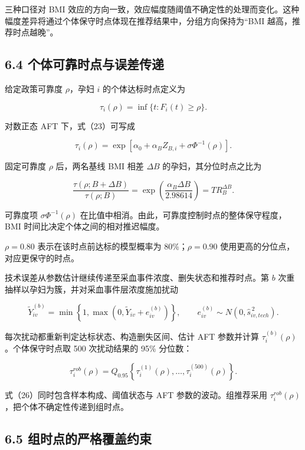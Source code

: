 \documentclass[UTF8,fontset=fandol,zihao=-4,a4paper]{ctexart}
\begin{document}
三种口径对 BMI
效应的方向一致，效应幅度随阈值不确定性的处理而变化。这种幅度差异将通过个体保守时点体现在推荐结果中，分组方向保持为``BMI
越高，推荐时点越晚''。

\subsection{6.4
个体可靠时点与误差传递}\label{ux4e2aux4f53ux53efux9760ux65f6ux70b9ux4e0eux8befux5deeux4f20ux9012}

给定政策可靠度 \(\rho\)，孕妇 \(i\) 的个体达标时点定义为

\[
\tau_i(\rho)
=\inf\{t:F_i(t)\ge\rho\}.
\tag{23}
\]

对数正态 AFT 下，式（23）可写成

\[
\tau_i(\rho)
=\exp\left[
\alpha_0+\alpha_BZ_{B,i}
+\sigma\Phi^{-1}(\rho)
\right].
\tag{24}
\]

固定可靠度 \(\rho\) 后，两名基线 BMI 相差 \(\Delta B\)
的孕妇，其分位时点之比为

\[
\frac{\tau(\rho;B+\Delta B)}{\tau(\rho;B)}
=\exp\left(\frac{\alpha_B\Delta B}{2.98614}\right)
=TR_B^{\Delta B}.
\tag{24a}
\]

可靠度项 \(\sigma\Phi^{-1}(\rho)\)
在比值中相消。由此，可靠度控制时点的整体保守程度，BMI
时间比决定个体之间的相对推迟幅度。

\(\rho=0.80\) 表示在该时点前达标的模型概率为 80\%；\(\rho=0.90\)
使用更高的分位点，对应更保守的时点。

技术误差从参数估计继续传递至采血事件浓度、删失状态和推荐时点。第 \(b\)
次重抽样以孕妇为簇，并对采血事件层浓度施加扰动

\[
\widetilde Y_{iv}^{(b)}
=\min\left\{
1,\max\left(0,\widetilde Y_{iv}+e_{iv}^{(b)}\right)
\right\},
\qquad
e_{iv}^{(b)}\sim N(0,\widehat s_{iv,tech}^{\,2}).
\tag{25}
\]

每次扰动都重新判定达标状态、构造删失区间、估计 AFT 参数并计算
\(\tau_i^{(b)}(\rho)\)。个体保守时点取 500 次扰动结果的 95\% 分位数：

\[
\tau_i^{rob}(\rho)
=Q_{0.95}\left\{
\tau_i^{(1)}(\rho),\ldots,
\tau_i^{(500)}(\rho)
\right\}.
\tag{26}
\]

式（26）同时包含样本构成、阈值状态与 AFT 参数的波动。组推荐采用
\(\tau_i^{rob}(\rho)\)，把个体不确定性传递到组时点。

\subsection{6.5
组时点的严格覆盖约束}\label{ux7ec4ux65f6ux70b9ux7684ux4e25ux683cux8986ux76d6ux7ea6ux675f}
\end{document}
